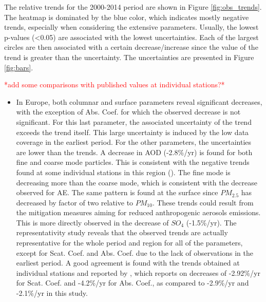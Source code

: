\documentclass[journal abbreviation, manuscript]{copernicus}
\begin{document}
The relative trends for the 2000-2014 period are shown in Figure \ref{fig:obs_trends}. The heatmap is dominated by the blue color, which indicates mostly negative trends, especially when considering the extensive parameters. Usually, the lowest p-values (<0.05) are associated with the lowest uncertainties. Each of the largest circles are then associated with a certain decrease/increase since the value of the trend is greater than the uncertainty. The uncertainties are presented in Figure \ref{fig:bars}.

\textcolor{red}{*add some comparisons with published values at individual stations?*}
\begin{itemize}
 \item In Europe, both columnar and surface parameters reveal significant decreases, with the exception of Abs. Coef. for which the observed decrease is not significant. For this last parameter, the associated uncertainty of the trend exceeds the trend itself. This large uncertainty is induced by the low data coverage in the earliest period. For the other parameters, the uncertainties are lower than the trends. A decrease in AOD (-2.8\%/yr) is found for both fine and coarse mode particles. This is consistent with the negative trends found at some individual stations in this region (\cite{glantz2019}). The fine mode is decreasing more than the coarse mode, which is consistent with the decrease observed for AE. The same pattern is found at the surface since $PM_{2.5}$ has decreased by factor of two relative to $PM_{10}$. These trends could result from the mitigation measures aiming for reduced anthropogenic aerosols emissions. This is more directly observed in the decrease of $SO_{4}$ (-1.5\%/yr). The representativity study reveals that the observed trends are actually representative for the whole period and region for all of the parameters, except for Scat. Coef. and Abs. Coef. due to the lack of observations in the earliest period. A good agreement is found with the trends obtained at individual stations and reported by \cite{collaudcoenprep}, which reports on decreases of -2.92\%/yr for Scat. Coef. and -4.2\%/yr for Abs. Coef., as compared to -2.9\%/yr and -2.1\%/yr in this study.

\end{itemize}
\end{document}
